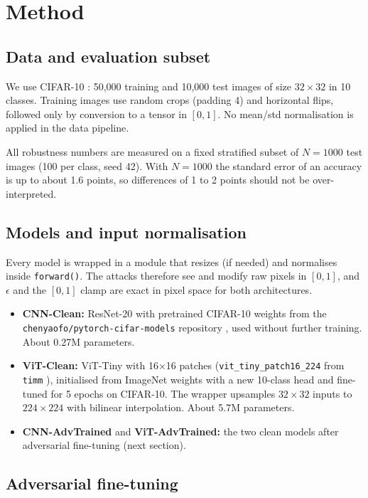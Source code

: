 \documentclass[a4paper,11pt]{article}
\begin{document}
\section{Method}

\subsection{Data and evaluation subset}

We use CIFAR-10 \cite{Krizhevsky:09}: 50,000 training and 10,000 test
images of size $32 \times 32$ in 10 classes. Training images use random
crops (padding 4) and horizontal flips, followed only by conversion to a
tensor in $[0,1]$. No mean/std normalisation is applied in the data
pipeline.

All robustness numbers are measured on a fixed stratified subset of
$N = 1000$ test images (100 per class, seed 42). With $N = 1000$ the
standard error of an accuracy is up to about 1.6 points, so differences
of 1 to 2 points should not be over-interpreted.

\subsection{Models and input normalisation}

Every model is wrapped in a module that resizes (if needed) and
normalises inside \texttt{forward()}. The attacks therefore see and
modify raw pixels in $[0,1]$, and $\epsilon$ and the $[0,1]$ clamp are
exact in pixel space for both architectures.

\begin{itemize}
\item \textbf{CNN-Clean:} ResNet-20 \cite{He:16} with pretrained CIFAR-10
weights from the \texttt{chenyaofo/pytorch-cifar-models} repository
\cite{Chenyaofo}, used without further training. About 0.27M parameters.
\item \textbf{ViT-Clean:} ViT-Tiny with 16$\times$16 patches
(\texttt{vit\_tiny\_patch16\_224} from \texttt{timm} \cite{Wightman:19}),
initialised from ImageNet weights with a new 10-class head and fine-tuned
for 5 epochs on CIFAR-10. The wrapper upsamples $32 \times 32$ inputs to
$224 \times 224$ with bilinear interpolation. About 5.7M parameters.
\item \textbf{CNN-AdvTrained} and \textbf{ViT-AdvTrained:} the two clean
models after adversarial fine-tuning (next section).
\end{itemize}

\subsection{Adversarial fine-tuning}
\end{document}
